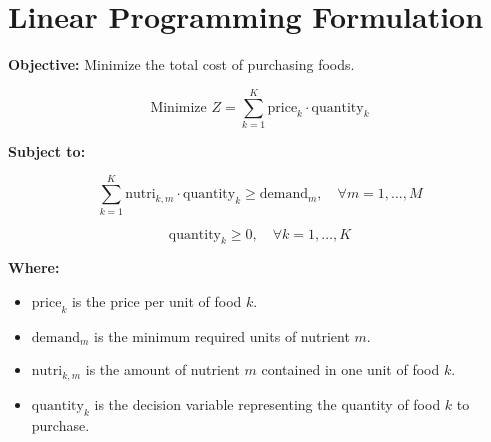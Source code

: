 \documentclass{article}
\begin{document}
\section*{Linear Programming Formulation}

\textbf{Objective:} Minimize the total cost of purchasing foods.

\[
\text{Minimize } Z = \sum_{k=1}^{K} \text{price}_k \cdot \text{quantity}_k
\]

\textbf{Subject to:}

\[
\sum_{k=1}^{K} \text{nutri}_{k, m} \cdot \text{quantity}_k \geq \text{demand}_m, \quad \forall m = 1,\ldots,M
\]

\[
\text{quantity}_k \geq 0, \quad \forall k = 1,\ldots,K
\]

\textbf{Where:}
\begin{itemize}
    \item \(\text{price}_k\) is the price per unit of food \(k\).
    \item \(\text{demand}_m\) is the minimum required units of nutrient \(m\).
    \item \(\text{nutri}_{k, m}\) is the amount of nutrient \(m\) contained in one unit of food \(k\).
    \item \(\text{quantity}_k\) is the decision variable representing the quantity of food \(k\) to purchase.
\end{itemize}
\end{document}
